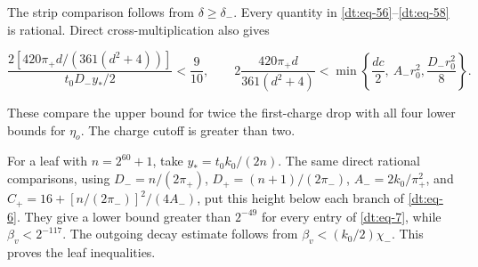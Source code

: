 The strip comparison follows from \(\delta\ge\delta_-\).
Every quantity in \eqref{dt:eq-56}--\eqref{dt:eq-58} is rational. Direct cross-multiplication
also gives

\begin{equation}\label{dt:eq-59}
\frac{2[420\pi_+d/(361(d^2+4))]}
             {t_0D_-y_*/2}<\frac9{10},
 \qquad
 2\frac{420\pi_+d}{361(d^2+4)}
 <\min\left\{\frac{dc}{2},\ A_-r_0^2,
                          \frac{D_-r_0^2}{8}\right\}.
\end{equation}

These compare the upper bound for twice the first-charge drop with
all four lower bounds for \(\eta_o\). The charge cutoff is greater
than two.

For a leaf with \(n=2^{60}+1\), take
\(y_*=t_0k_0/(2n)\). The same direct rational comparisons, using
\(D_-=n/(2\pi_+)\), \(D_+=(n+1)/(2\pi_-)\),
\(A_-=2k_0/\pi_+^2\), and
\(C_+=16+[n/(2\pi_-)]^2/(4A_-)\), put this height below each
branch of \eqref{dt:eq-6}. They give a lower bound greater than \(2^{-49}\)
for every entry of \eqref{dt:eq-7}, while \(\beta_v<2^{-117}\).
The outgoing decay estimate follows from
\(\beta_v<(k_0/2)\chi_-\). This proves the leaf inequalities.
